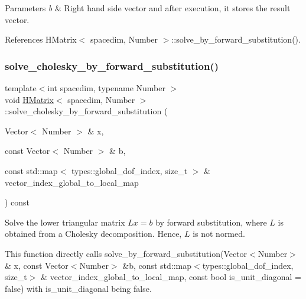\begin{DoxyParams}{Parameters}
{\em b} & Right hand side vector and after execution, it stores the result vector. \\
\hline
\end{DoxyParams}


References H\+Matrix$<$ spacedim, Number $>$\+::solve\+\_\+by\+\_\+forward\+\_\+substitution().

\mbox{\label{classHMatrix_a0b81214fb9287b344dff8349c7122583}} 
\subsubsection{\texorpdfstring{solve\+\_\+cholesky\+\_\+by\+\_\+forward\+\_\+substitution()}{solve\_cholesky\_by\_forward\_substitution()}\hspace{0.1cm}{\footnotesize\ttfamily [4/4]}}
{\footnotesize\ttfamily template$<$int spacedim, typename Number $>$ \\
void \hyperlink{classHMatrix}{H\+Matrix}$<$ spacedim, Number $>$\+::solve\+\_\+cholesky\+\_\+by\+\_\+forward\+\_\+substitution (\begin{DoxyParamCaption}\item[{Vector$<$ Number $>$ \&}]{x,  }\item[{const Vector$<$ Number $>$ \&}]{b,  }\item[{const std\+::map$<$ types\+::global\+\_\+dof\+\_\+index, size\+\_\+t $>$ \&}]{vector\+\_\+index\+\_\+global\+\_\+to\+\_\+local\+\_\+map }\end{DoxyParamCaption}) const}

Solve the lower triangular matrix $Lx=b$ by forward substitution, where $L$ is obtained from a Cholesky decomposition. Hence, $L$ is not normed.

This function directly calls {\ttfamily solve\+\_\+by\+\_\+forward\+\_\+substitution}(Vector$<$\+Number$>$ \& x, const Vector$<$\+Number$>$ \&b, const std\+::map$<$types\+::global\+\_\+dof\+\_\+index, size\+\_\+t$>$ \& vector\+\_\+index\+\_\+global\+\_\+to\+\_\+local\+\_\+map, const bool is\+\_\+unit\+\_\+diagonal = false) with {\ttfamily is\+\_\+unit\+\_\+diagonal} being {\ttfamily false}.


